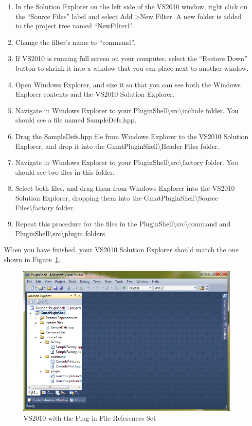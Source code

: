 \documentclass[10pt,letterpaper]{article}
\begin{document}
\begin{enumerate}
\setcounter{enumi}{\value{saveenum}}
\item In the Solution Explorer on the left side of the VS2010 window, right click on the ``Source Files'' label and select Add \textgreater New Filter.  A new folder is added to the project tree named ``NewFilter1'.  
\item Change the filter's name to ``command''.
\item If VS2010 is running full screen on your computer, select the ``Restore Down'' button to shrink it into a window that you can place next to another window.
\item Open Windows Explorer, and size it so that you can see both the Windows Explorer contents and the VS2010 Solution Explorer.
\item Navigate in Windows Explorer to your PluginShell{\textbackslash}src{\textbackslash}include folder.  You should see a file named SampleDefs.hpp.
\item Drag the SampleDefs.hpp file from Windows Explorer to the VS2010 Solution Explorer, and drop it into the GmatPluginShell{\textbackslash}Header Files folder.
\item Navigate in Windows Explorer to your PluginShell{\textbackslash}src{\textbackslash}factory folder.  You should see two files in this folder.
\item Select both files, and drag them from Windows Explorer into the VS2010 Solution Explorer, dropping them into the GmatPluginShell{\textbackslash}Source Files{\textbackslash}factory folder.
\item Repeat this procedure for the files in the PluginShell{\textbackslash}src{\textbackslash}command and PluginShell{\textbackslash}src{\textbackslash}plugin folders.
\end{enumerate}

\noindent When you have finished, your VS2010 Solution Explorer should match the one shown in Figure~\ref{VS2010WithFiles}.

\begin{figure}[htb]
\begin{center}
\includegraphics[scale=.5]{images/VS2010WithFiles.png}
\caption{\label{VS2010WithFiles}VS2010 with the Plug-in File References Set}
\end{center}
\end{figure} 
\end{document}
